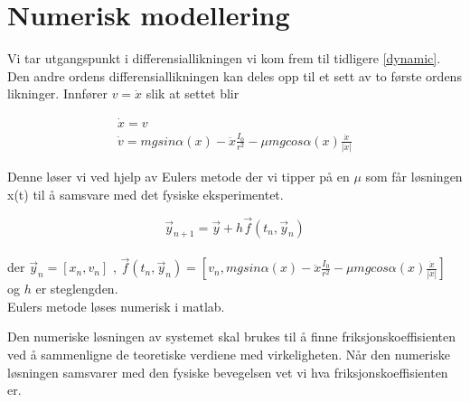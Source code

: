 \documentclass[5p,sort&compress]{elsarticle}
\begin{document}
\section{Numerisk modellering}

Vi tar utgangspunkt i differensiallikningen vi kom frem til tidligere \eqref{dynamic}.
Den andre ordens differensiallikningen kan deles opp til et sett av to første ordens likninger. Innfører $ v = \dot{x}$ slik at settet blir

 \begin{subequations}
    \begin{align}
      \dot{x} = v \\
      \dot{v} = mgsin\alpha (x) - \ddot{x}\frac{I_{0}}{r^2} - \mu mgcos\alpha (x) \frac{\dot{x}}{|\dot{x}|} 
    \end{align}
  \end{subequations}

Denne løser vi ved hjelp av Eulers metode der vi tipper på en $\mu$ som får løsningen x(t) til å samsvare med det fysiske eksperimentet.

\begin{equation}
\vec{y}_{n+1} = \vec{y} + h\vec{f}(t_n,\vec{y}_n)
\label{eq:EulerMethod}
\end{equation}
\\
der $\vec{y}_n = [x_{n} , v_{n}]$ , $ \vec{f}(t_n , \vec{y}_n) = [v_{n} , mgsin\alpha (x) - \ddot{x}\frac{I_{0}}{r^2} - \mu mgcos\alpha (x) \frac{\dot{x}}{|\dot{x}|}]$ og $h$ er steglengden.\\ Eulers metode løses numerisk i matlab.

Den numeriske løsningen av systemet skal brukes til å finne friksjonskoeffisienten ved å sammenligne de teoretiske verdiene med virkeligheten. Når den numeriske løsningen samsvarer med den fysiske bevegelsen vet vi hva friksjonskoeffisienten er.\\

\end{document}
